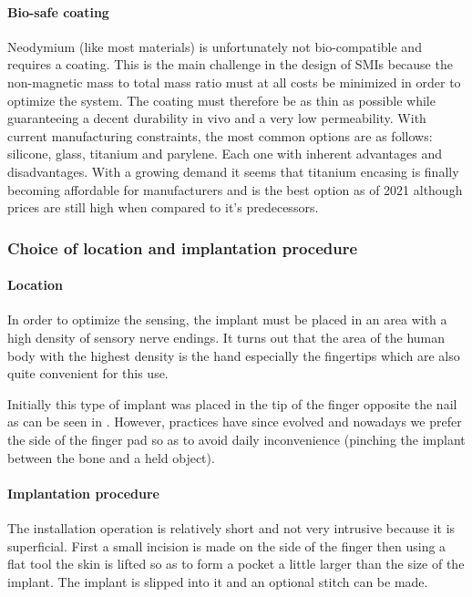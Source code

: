 \documentclass[10pt,journal,compsoc]{IEEEtran}
\begin{document}
			\paragraph{Bio-safe coating}
			Neodymium (like most materials) is unfortunately not bio-compatible and requires a coating. This is the main challenge in the design of SMIs because the non-magnetic mass to total mass ratio must at all costs be minimized in order to optimize the system. The coating must therefore be as thin as possible while guaranteeing a decent durability in vivo and a very low permeability. With current manufacturing constraints, the most common options are as follows: silicone, glass, titanium and parylene. Each one with inherent advantages and disadvantages. With a growing demand it seems that titanium encasing is finally becoming affordable for manufacturers and is the best option as of 2021 although prices are still high when compared to it's predecessors.
			
		\subsubsection{Choice of location and implantation procedure} 
			\paragraph{Location}
			In order to optimize the sensing, the implant must be placed in an area with a high density of sensory nerve endings. It turns out that the area of the human body with the highest density is the hand especially the fingertips which are also quite convenient for this use.
			
			Initially this type of implant was placed in the tip of the finger opposite the nail as can be seen in \cite{hameed2010ieee}. However, practices have since evolved and nowadays we prefer the side of the finger pad so as to avoid daily inconvenience (pinching the implant between the bone and a held object).
			\paragraph{Implantation procedure}
			The installation operation is relatively short and not very intrusive because it is superficial. First a small incision is made on the side of the finger then using a flat tool the skin is lifted so as to form a pocket a little larger than the size of the implant. The implant is slipped into it and an optional stitch can be made.
			
\end{document}
